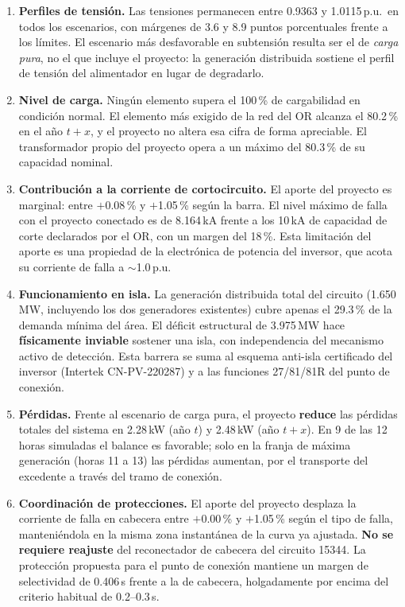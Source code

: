 \documentclass[11pt,a4paper]{article}
\begin{document}
\begin{enumerate}
\item \textbf{Perfiles de tensi\'on.} Las tensiones permanecen entre 0.9363 y
1.0115\,p.u.\ en todos los escenarios, con m\'argenes de 3.6 y 8.9 puntos
porcentuales frente a los l\'imites. El escenario m\'as desfavorable en
subtensi\'on resulta ser el de \emph{carga pura}, no el que incluye el proyecto:
la generaci\'on distribuida sostiene el perfil de tensi\'on del alimentador en
lugar de degradarlo.

\item \textbf{Nivel de carga.} Ning\'un elemento supera el 100\,\% de
cargabilidad en condici\'on normal. El elemento m\'as exigido de la red del OR
alcanza el 80.2\,\% en el a\~no $t+x$, y el proyecto no altera esa cifra de forma
apreciable. El transformador propio del proyecto opera a un m\'aximo del 80.3\,\%
de su capacidad nominal.

\item \textbf{Contribuci\'on a la corriente de cortocircuito.} El aporte del
proyecto es marginal: entre $+$0.08\,\% y $+$1.05\,\% seg\'un la barra. El nivel
m\'aximo de falla con el proyecto conectado es de 8.164\,kA frente a los 10\,kA
de capacidad de corte declarados por el OR, con un margen del 18\,\%. Esta
limitaci\'on del aporte es una propiedad de la electr\'onica de potencia del
inversor, que acota su corriente de falla a $\sim$1.0\,p.u.

\item \textbf{Funcionamiento en isla.} La generaci\'on distribuida total del
circuito (1.650\,MW, incluyendo los dos generadores existentes) cubre apenas el
29.3\,\% de la demanda m\'inima del \'area. El d\'eficit estructural de 3.975\,MW
hace \textbf{f\'isicamente inviable} sostener una isla, con independencia del
mecanismo activo de detecci\'on. Esta barrera se suma al esquema anti-isla
certificado del inversor (Intertek CN-PV-220287) y a las funciones 27/81/81R del
punto de conexi\'on.

\item \textbf{P\'erdidas.} Frente al escenario de carga pura, el proyecto
\textbf{reduce} las p\'erdidas totales del sistema en 2.28\,kW (a\~no $t$) y
2.48\,kW (a\~no $t+x$). En 9 de las 12 horas simuladas el balance es favorable;
solo en la franja de m\'axima generaci\'on (horas 11 a 13) las p\'erdidas
aumentan, por el transporte del excedente a trav\'es del tramo de conexi\'on.

\item \textbf{Coordinaci\'on de protecciones.} El aporte del proyecto desplaza la
corriente de falla en cabecera entre $+$0.00\,\% y $+$1.05\,\% seg\'un el tipo de
falla, manteni\'endola en la misma zona instant\'anea de la curva ya ajustada.
\textbf{No se requiere reajuste} del reconectador de cabecera del circuito 15344.
La protecci\'on propuesta para el punto de conexi\'on mantiene un margen de
selectividad de 0.406\,s frente a la de cabecera, holgadamente por encima del
criterio habitual de 0.2--0.3\,s.
\end{enumerate}
\end{document}
